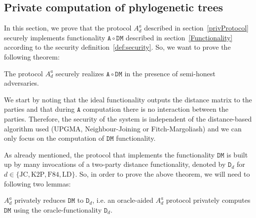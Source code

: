\subsection{Private computation of phylogenetic trees}

In this section, we prove that the protocol $A^a_d$ described in section~\ref{privProtocol} securely implements functionality $\mathtt{A}\circ \mathtt{DM}$ described in section~\ref{Functionality} according to the security definition~\ref{def:security}. So, we want to prove the following theorem:

\begin{theorem}
The protocol $A^a_d$ securely realizes $\mathtt{A}\circ \mathtt{DM}$ in the presence of semi-honest adversaries.
\end{theorem}

We start by noting that the ideal functionality outputs the distance matrix to the parties and that during $\mathtt{A}$ computation there is no interaction between the parties. Therefore, the security of the system is independent of the distance-based algorithm used (UPGMA, Neighbour-Joining or Fitch-Margoliash) and we can only focus on the computation of $\mathtt{DM}$ functionality.

As already mentioned, the protocol that implements the functionality $\mathtt{DM}$ is built up by many invocations of a two-party distance functionality, denoted by $\mathtt{D}_d$ for $d\in\{\text{JC}, \text{K2P}, \text{F84}, \text{LD}\}$. So, in order to prove the above theorem, we will need to following two lemmas:

\begin{lemma}\label{firstlemma}
$A^a_d$ privately reduces $\mathtt{DM}$ to $\mathtt{D}_d$, i.e. an oracle-aided $A^a_d$ protocol privately computes $\mathtt{DM}$ using the oracle-functionality $\mathtt{D}_d$.
\end{lemma}

